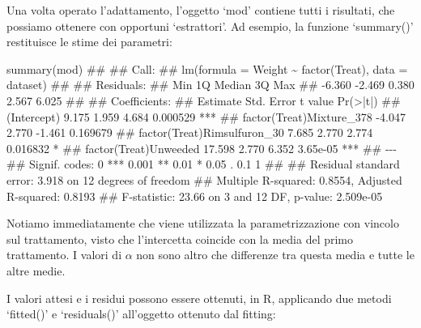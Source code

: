 \documentclass[a4paper,12pt,oneside]{book}
\newenvironment{Shaded}{\begin{snugshade}}{\end{snugshade}}
\newcommand{\DocumentationTok}[1]{#1}
\newcommand{\FunctionTok}[1]{#1}
\newcommand{\NormalTok}[1]{#1}
\begin{document}
Una volta operato l'adattamento, l'oggetto `mod' contiene tutti i risultati, che possiamo ottenere con opportuni `estrattori'. Ad esempio, la funzione `summary()' restituisce le stime dei parametri:

\vspace{12pt}

\tiny

\begin{Shaded}
\begin{Highlighting}[]
\FunctionTok{summary}\NormalTok{(mod)}
\DocumentationTok{\#\# }
\DocumentationTok{\#\# Call:}
\DocumentationTok{\#\# lm(formula = Weight \textasciitilde{} factor(Treat), data = dataset)}
\DocumentationTok{\#\# }
\DocumentationTok{\#\# Residuals:}
\DocumentationTok{\#\#    Min     1Q Median     3Q    Max }
\DocumentationTok{\#\# {-}6.360 {-}2.469  0.380  2.567  6.025 }
\DocumentationTok{\#\# }
\DocumentationTok{\#\# Coefficients:}
\DocumentationTok{\#\#                             Estimate Std. Error t value Pr(\textgreater{}|t|)    }
\DocumentationTok{\#\# (Intercept)                    9.175      1.959   4.684 0.000529 ***}
\DocumentationTok{\#\# factor(Treat)Mixture\_378      {-}4.047      2.770  {-}1.461 0.169679    }
\DocumentationTok{\#\# factor(Treat)Rimsulfuron\_30    7.685      2.770   2.774 0.016832 *  }
\DocumentationTok{\#\# factor(Treat)Unweeded         17.598      2.770   6.352 3.65e{-}05 ***}
\DocumentationTok{\#\# {-}{-}{-}}
\DocumentationTok{\#\# Signif. codes:  0 \textquotesingle{}***\textquotesingle{} 0.001 \textquotesingle{}**\textquotesingle{} 0.01 \textquotesingle{}*\textquotesingle{} 0.05 \textquotesingle{}.\textquotesingle{} 0.1 \textquotesingle{} \textquotesingle{} 1}
\DocumentationTok{\#\# }
\DocumentationTok{\#\# Residual standard error: 3.918 on 12 degrees of freedom}
\DocumentationTok{\#\# Multiple R{-}squared:  0.8554, Adjusted R{-}squared:  0.8193 }
\DocumentationTok{\#\# F{-}statistic: 23.66 on 3 and 12 DF,  p{-}value: 2.509e{-}05}
\end{Highlighting}
\end{Shaded}

\normalsize

Notiamo immediatamente che viene utilizzata la parametrizzazione con vincolo sul trattamento, visto che l'intercetta coincide con la media del primo trattamento. I valori di \(\alpha\) non sono altro che differenze tra questa media e tutte le altre medie.

I valori attesi e i residui possono essere ottenuti, in R, applicando due metodi `fitted()' e `residuals()' all'oggetto ottenuto dal fitting:
\end{document}
